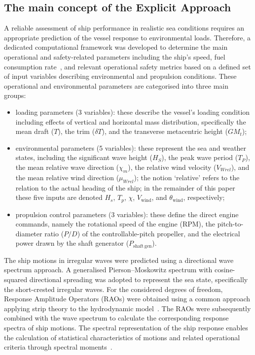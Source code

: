 \documentclass[final,5p,times,twocolumn,numbers]{elsarticle}
\begin{document}
\subsection{The main concept of the Explicit Approach}
A reliable assessment of ship performance in realistic sea conditions requires an appropriate prediction of the vessel response to environmental loads. Therefore, a dedicated computational framework was developed to determine the main operational and safety-related parameters including the ship's speed, fuel consumption rate~\cite{krata2021}, and relevant operational safety metrics based on a defined set of input variables describing environmental and propulsion conditions. These operational and environmental parameters are categorised into three main groups:
\begin{itemize}
\item loading parameters (3 variables): these describe the vessel's loading condition including effects of vertical and horizontal mass distribution, specifically the mean draft ($T$), the trim ($\delta T$), and the transverse metacentric height ($GM_t$);
\item environmental parameters (5 variables): these represent the sea and weather states, including the significant wave height ($H_S$), the peak wave period ($T_P$), the mean relative wave direction ($\chi_m$), the relative wind velocity ($V_{Wrel}$), and the mean relative wind direction ($\mu_{Wrel}$); the notion `relative' refers to the relation to the actual heading of the ship; in the remainder of this paper these five inputs are denoted $H_s$, $T_p$, $\chi$, $V_{\mathrm{wind}}$, and $\theta_{\mathrm{wind}}$, respectively;
\item propulsion control parameters (3 variables): these define the direct engine commands, namely the rotational speed of the engine (RPM), the pitch-to-diameter ratio ($P/D$) of the controllable-pitch propeller, and the electrical power drawn by the shaft generator ($P_\mathrm{shaft\,gen}$).
\end{itemize}

The ship motions in irregular waves were predicted using a directional wave spectrum approach. A generalised Pierson--Moskowitz spectrum with cosine-squared directional spreading was adopted to represent the sea state, specifically the short-crested irregular waves. For the considered degrees of freedom, Response Amplitude Operators (RAOs) were obtained using a common approach applying strip theory to the hydrodynamic model~\cite{journee1992}. The RAOs were subsequently combined with the wave spectrum to calculate the corresponding response spectra of ship motions. The spectral representation of the ship response enables the calculation of statistical characteristics of motions and related operational criteria through spectral moments~\cite{journee2002}.
\end{document}
